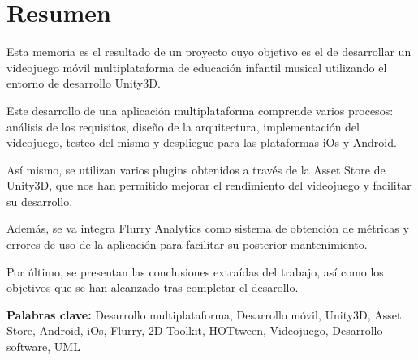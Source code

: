 \cleardoublepage
{}
\chapter*{Resumen}

Esta memoria es el resultado de un proyecto cuyo objetivo es el de desarrollar un videojuego móvil multiplataforma de educación infantil musical utilizando el entorno de desarrollo Unity3D.

Este desarrollo de una aplicación multiplataforma comprende varios procesos: análisis de los requisitos, diseño de la arquitectura, implementación del videojuego, testeo del mismo y despliegue para las plataformas iOs y Android.

Así mismo, se utilizan varios plugins obtenidos a través de la Asset Store de Unity3D, que nos han permitido mejorar el rendimiento del videojuego y facilitar su desarrollo.

Además, se va integra Flurry Analytics como sistema de obtención de métricas y errores de uso de la aplicación para facilitar su posterior mantenimiento.

Por último, se presentan las conclusiones extraídas del trabajo, así como los objetivos que se han alcanzado tras completar el desarollo.

\vfill
\textbf{Palabras clave:} Desarrollo multiplataforma, Desarrollo móvil, Unity3D, Asset Store, Android, iOs, Flurry, 2D Toolkit, HOTtween, Videojuego, Desarrollo software, UML